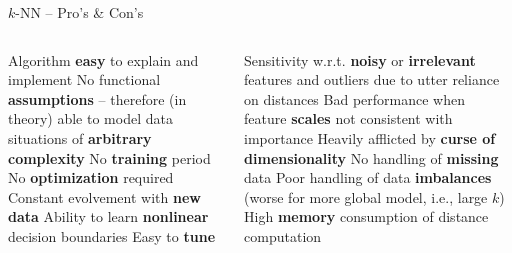 
\begin{frame}{$k$-NN -- Pro's \& Con's}

\footnotesize

\begin{columns}[onlytextwidth]
  \begin{column}{0.5\textwidth}
    \footnotesize
    \begin{itemize}
      \positem Algorithm \textbf{easy} to explain and implement
      \positem No functional \textbf{assumptions} -- therefore (in theory) able 
      to model data situations of \textbf{arbitrary complexity}
      \positem No \textbf{training} period
      \positem No \textbf{optimization} required 
      \positem Constant evolvement with \textbf{new data}
      \positem Ability to learn \textbf{nonlinear} decision boundaries
      \positem Easy to \textbf{tune}
    \end{itemize}
  \end{column}
  \begin{column}{0.5\textwidth}
    \footnotesize
    \begin{itemize}
      \negitem Sensitivity w.r.t. \textbf{noisy} or \textbf{irrelevant} features
      and outliers due to utter reliance on distances
      \negitem Bad performance when feature \textbf{scales} not consistent 
      with importance
      \negitem Heavily afflicted by \textbf{curse of dimensionality}
      \negitem No handling of \textbf{missing} data
      \negitem Poor handling of data \textbf{imbalances} (worse for more global 
      model, i.e., large $k$)
      \negitem High \textbf{memory} consumption of distance computation
    \end{itemize}
  \end{column}
\end{columns}

\vfill

\small


\end{frame}


